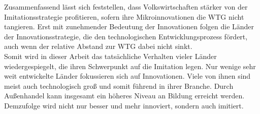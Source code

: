 Zusammenfassend lässt sich feststellen, dass Volkswirtschaften stärker von der Imitationsstrategie profitieren, sofern ihre Mikroinnovationen die WTG nicht tangieren. Erst mit zunehmender Bedeutung der Innovationen folgen die Länder der Innovationsstrategie, die den technologischen Entwicklungsprozess fördert, auch wenn der relative Abstand zur WTG dabei nicht sinkt. \\
Somit wird in dieser Arbeit das tatsächliche Verhalten vieler Länder wiedergespiegelt, die ihren Schwerpunkt auf die Imitation legen. Nur wenige sehr weit entwickelte Länder fokussieren sich auf Innovationen. Viele von ihnen sind meist auch technologisch gro{\ss} und somit führend in ihrer Branche. Durch Au{\ss}enhandel kann insgesamt ein höheres Niveau an Bildung erreicht werden. Demzufolge wird nicht nur besser und mehr innoviert, sondern auch imitiert.